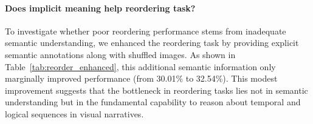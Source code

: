 \begin{table}[htbp]
    \centering
    \caption{Performance with different input format for understanding task. }
    \label{tab:understanding}
\end{table}
\paragraph{Does implicit meaning help reordering task?}
To investigate whether poor reordering performance stems from inadequate semantic understanding, we enhanced the reordering task by providing explicit semantic annotations along with shuffled images. As shown in Table~\ref{tab:reorder_enhanced}, this additional semantic information only marginally improved performance (from 30.01\% to 32.54\%). This modest improvement suggests that the bottleneck in reordering tasks lies not in semantic understanding but in the fundamental capability to reason about temporal and logical sequences in visual narratives.

\begin{table}[htbp]
    \centering
    \caption{Performance with enhanced data (correct answer for comprehension task) for reordering task.}
    \label{tab:reorder_enhanced}
\end{table}

